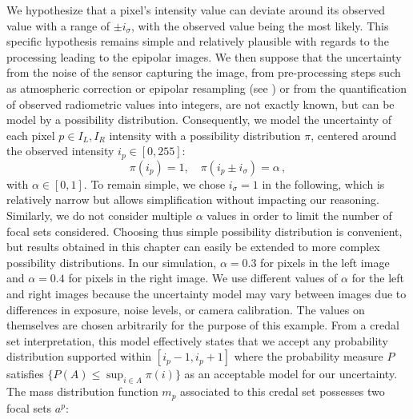 We hypothesize that a pixel's intensity value can deviate around its observed value with a range of $\pm i_\sigma$, with the observed value being the most likely. This specific hypothesis remains simple and relatively plausible with regards to the processing leading to the epipolar images. We then suppose that the uncertainty from the noise of the sensor capturing the image, from pre-processing steps such as atmospheric correction or epipolar resampling (see ) or from the quantification of observed radiometric values into integers, are not exactly known, but can be model by a possibility distribution. Consequently, we model the uncertainty of each pixel $p\in I_L,I_R$ intensity with a possibility distribution $\pi$, centered around the observed intensity $i_p\in[0,255]$:
\begin{equation}\label{eq:pixel_possibility}
    \pi(i_p)=1,\quad \pi(i_p\pm i_\sigma)=\alpha\,,
\end{equation}
with $\alpha \in [0,1]$. To remain simple, we chose $i_\sigma=1$ in the following, which is relatively narrow but allows simplification without impacting our reasoning. Similarly, we do not consider multiple $\alpha$ values in order to limit the number of focal sets considered. Choosing thus simple possibility distribution is convenient, but results obtained in this chapter can easily be extended to more complex possibility distributions. In our simulation, $\alpha = 0.3$ for pixels in the left image and $\alpha = 0.4$ for pixels in the right image. We use different values of $\alpha$ for the left and right images because the uncertainty model may vary between images due to differences in exposure, noise levels, or camera calibration. The values on themselves are chosen arbitrarily for the purpose of this example. From a credal set interpretation, this model effectively states that we accept any probability distribution supported within $[i_p - 1, i_p + 1]$ where the probability measure $P$ satisfies $\{P(A) \leq \sup_{i \in A} \pi(i)\}$ as an acceptable model for our uncertainty. The mass distribution function $m_p$ associated to this credal set possesses two focal sets $a^p$:
